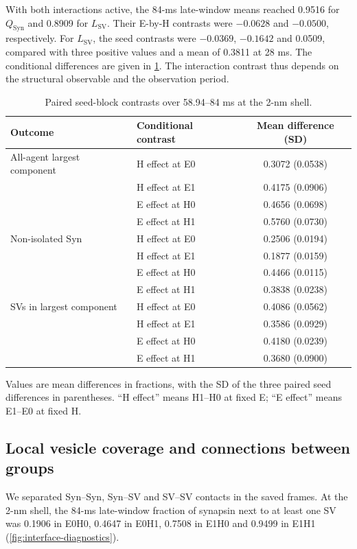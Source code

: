 \documentclass[11pt,letterpaper]{article}
\newcommand{\Syn}{\mathrm{Syn}}
\newcommand{\SV}{\mathrm{SV}}
\begin{document}
With both interactions active, the 84-ms late-window means reached
0.9516 for $Q_{\Syn}$ and 0.8909 for $L_{\SV}$.
Their E-by-H contrasts were $-0.0628$ and $-0.0500$, respectively.
For $L_{\SV}$, the seed contrasts were $-0.0369$, $-0.1642$ and 0.0509,
compared with three positive values and a mean of 0.3811 at 28 ms.
The conditional differences are given in \cref{tab:force-contrasts}.
The interaction contrast thus depends on the structural observable
and the observation period.

\begin{table}[htbp]\centering\small
\caption{Paired seed-block contrasts over 58.94--84 ms at the 2-nm shell.}
\label{tab:force-contrasts}
\begin{tabular}{@{}llc@{}}\toprule
Outcome & Conditional contrast & Mean difference (SD) \\
\midrule
All-agent largest component & H effect at E0 & 0.3072 (0.0538) \\
 & H effect at E1 & 0.4175 (0.0906) \\
 & E effect at H0 & 0.4656 (0.0698) \\
 & E effect at H1 & 0.5760 (0.0730) \\
\addlinespace
Non-isolated Syn & H effect at E0 & 0.2506 (0.0194) \\
 & H effect at E1 & 0.1877 (0.0159) \\
 & E effect at H0 & 0.4466 (0.0115) \\
 & E effect at H1 & 0.3838 (0.0238) \\
\addlinespace
SVs in largest component & H effect at E0 & 0.4086 (0.0562) \\
 & H effect at E1 & 0.3586 (0.0929) \\
 & E effect at H0 & 0.4180 (0.0239) \\
 & E effect at H1 & 0.3680 (0.0900) \\
\bottomrule\end{tabular}
\par\smallskip\raggedright
Values are mean differences in fractions, with the SD of the three
paired seed differences in parentheses. ``H effect'' means H1--H0
at fixed E; ``E effect'' means E1--E0 at fixed H.
\end{table}

\subsection{Local vesicle coverage and connections between groups}
We separated Syn--Syn, Syn--SV and SV--SV contacts in the saved frames.
At the 2-nm shell, the 84-ms late-window fraction of synapsin next to
at least one SV was 0.1906 in E0H0, 0.4647 in E0H1, 0.7508 in E1H0
and 0.9499 in E1H1 (\cref{fig:interface-diagnostics}).
\end{document}
